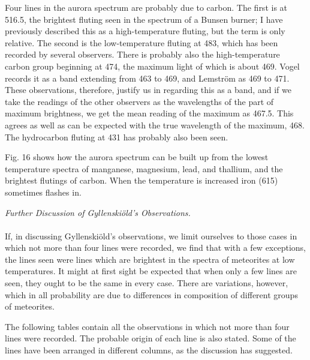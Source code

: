 \documentclass[a4paper, 12pt, oneside, polutonikogreek, english]{article}
\begin{document}
Four lines in the aurora spectrum are probably due to carbon. The first is at 516.5, the brightest fluting seen in the spectrum of a Bunsen burner; I have previously described this as a high-temperature fluting, but the term is only relative. The second is the low-temperature fluting at 483, which has been recorded by several observers. There is probably also the high-temperature carbon group beginning at 474, the maximum light of which is about 469. Vogel records it as a band extending from 463 to 469, and Lemström as 469 to 471. These observations, therefore, justify us in regarding this as a band, and if we take the readings of the other observers as the wavelengths of the part of maximum brightness, we get the mean reading of the maximum as 467.5. This agrees as well as can be expected with the true wavelength of the maximum, 468. The hydrocarbon fluting at 431 has probably also been seen.

Fig. 16 shows how the aurora spectrum can be built up from the lowest temperature spectra of manganese, magnesium, lead, and thallium, and the brightest flutings of carbon. When the temperature is increased iron (615) sometimes flashes in.
\begin{center}
\emph{Further Discussion of Gyllenskiöld's Observations.}
\end{center}
\paragraph{}
If, in discussing Gyllenskiöld's observations, we limit ourselves to those cases in which not more than four lines were recorded, we find that with a few exceptions, the lines seen were lines which are brightest in the spectra of meteorites at low temperatures. It might at first sight be expected that when only a few lines are seen, they ought to be the same in every case. There are variations, however, which in all probability are due to differences in composition of different groups of meteorites.

The following tables contain all the observations in which not more than four lines were recorded. The probable origin of each line is also stated. Some of the lines have been arranged in different columns, as the discussion has suggested.
\end{document}
